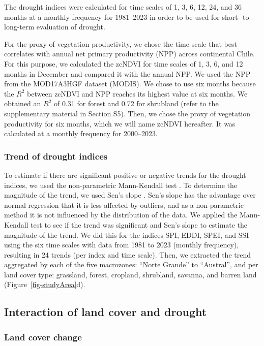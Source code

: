 \documentclass[
  authoryear,
  preprint,
  3p,
  onecolumn]{elsarticle}
\begin{document}
The drought indices were calculated for time scales of 1, 3, 6, 12, 24,
and 36 months at a monthly frequency for 1981--2023 in order to be used
for short- to long-term evaluation of drought.

For the proxy of vegetation productivity, we chose the time scale that
best correlates with annual net primary productivity (NPP) across
continental Chile. For this purpose, we calculated the zcNDVI for time
scales of 1, 3, 6, and 12 months in December and compared it with the
annual NPP. We used the NPP from the MOD17A3HGF \citep{Running2019}
dataset (MODIS). We chose to use six months because the \(R^2\) between
zcNDVI and NPP reaches its highest value at six months. We obtained an
\(R^2\) of 0.31 for forest and 0.72 for shrubland (refer to the
supplementary material in Section S5). Then, we chose the proxy of
vegetation productivity for six months, which we will name zcNDVI
hereafter. It was calculated at a monthly frequency for 2000--2023.

\subsubsection{Trend of drought indices}\label{trend-of-drought-indices}

To estimate if there are significant positive or negative trends for the
drought indices, we used the non-parametric Mann-Kendall test
\citep{Kendall1975}. To determine the magnitude of the trend, we used
Sen's slope \citep{Sen1968}. Sen's slope has the advantage over normal
regression that it is less affected by outliers, and as a non-parametric
method it is not influenced by the distribution of the data. We applied
the Mann-Kendall test to see if the trend was significant and Sen's
slope to estimate the magnitude of the trend. We did this for the
indices SPI, EDDI, SPEI, and SSI using the six time scales with data
from 1981 to 2023 (monthly frequency), resulting in 24 trends (per index
and time scale). Then, we extracted the trend aggregated by each of the
five macrozones: ``Norte Grande'' to ``Austral'', and per land cover
type: grassland, forest, cropland, shrubland, savanna, and barren land
(Figure~\ref{fig-studyArea}d).

\subsection{Interaction of land cover and
drought}\label{interaction-of-land-cover-and-drought}

\subsubsection{Land cover change}\label{land-cover-change}
\end{document}
